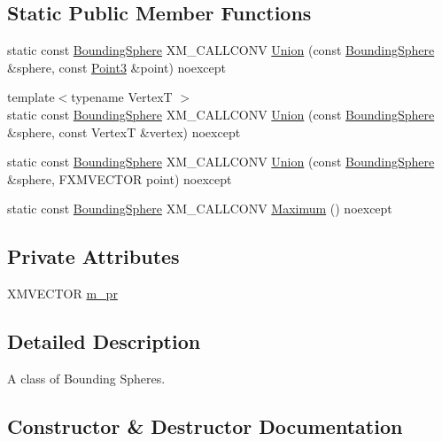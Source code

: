 \subsection*{Static Public Member Functions}
\begin{DoxyCompactItemize}
\item 
static const \hyperlink{classmage_1_1_bounding_sphere}{Bounding\+Sphere} X\+M\+\_\+\+C\+A\+L\+L\+C\+O\+NV \hyperlink{classmage_1_1_bounding_sphere_a519f2f7bf6439ea384d5da60557223bf}{Union} (const \hyperlink{classmage_1_1_bounding_sphere}{Bounding\+Sphere} \&sphere, const \hyperlink{structmage_1_1_point3}{Point3} \&point) noexcept
\item 
{\footnotesize template$<$typename VertexT $>$ }\\static const \hyperlink{classmage_1_1_bounding_sphere}{Bounding\+Sphere} X\+M\+\_\+\+C\+A\+L\+L\+C\+O\+NV \hyperlink{classmage_1_1_bounding_sphere_a14660f9e7b33be68fabae6d4036b4d8b}{Union} (const \hyperlink{classmage_1_1_bounding_sphere}{Bounding\+Sphere} \&sphere, const VertexT \&vertex) noexcept
\item 
static const \hyperlink{classmage_1_1_bounding_sphere}{Bounding\+Sphere} X\+M\+\_\+\+C\+A\+L\+L\+C\+O\+NV \hyperlink{classmage_1_1_bounding_sphere_af9398725d5a70f47acedfb276f5060c5}{Union} (const \hyperlink{classmage_1_1_bounding_sphere}{Bounding\+Sphere} \&sphere, F\+X\+M\+V\+E\+C\+T\+OR point) noexcept
\item 
static const \hyperlink{classmage_1_1_bounding_sphere}{Bounding\+Sphere} X\+M\+\_\+\+C\+A\+L\+L\+C\+O\+NV \hyperlink{classmage_1_1_bounding_sphere_afbdb210289e14ceeb69d62d1d0585b93}{Maximum} () noexcept
\end{DoxyCompactItemize}
\subsection*{Private Attributes}
\begin{DoxyCompactItemize}
\item 
X\+M\+V\+E\+C\+T\+OR \hyperlink{classmage_1_1_bounding_sphere_a787aea4f26cca30e3c30d85da3533b9d}{m\+\_\+pr}
\end{DoxyCompactItemize}


\subsection{Detailed Description}
A class of Bounding Spheres. 

\subsection{Constructor \& Destructor Documentation}
\hypertarget{classmage_1_1_bounding_sphere_a3bf22ae012630101af6578173958aebc}{}\label{classmage_1_1_bounding_sphere_a3bf22ae012630101af6578173958aebc} 
